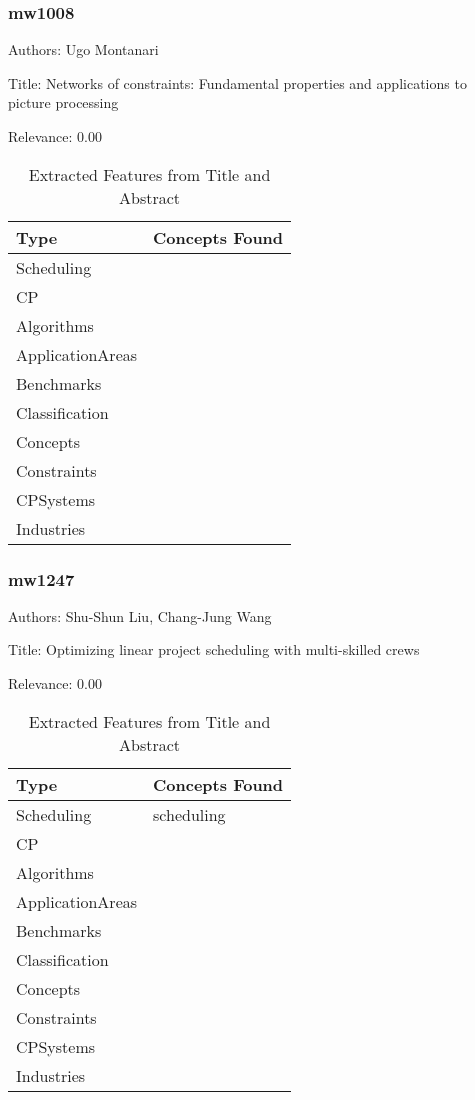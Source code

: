 \subsubsection{mw1008}
\label{mw:mw1008}

Authors: Ugo Montanari

Title: Networks of constraints: Fundamental properties and applications to picture processing

Relevance:  0.00

{\scriptsize
\begin{longtable}{p{2cm}p{20cm}}
\caption{Extracted Features from Title and Abstract}\\ \toprule
Type & Concepts Found\\ \midrule
\endhead
\bottomrule
\endfoot
Scheduling & \\ 
CP & \\ 
Algorithms & \\ 
ApplicationAreas & \\ 
Benchmarks & \\ 
Classification & \\ 
Concepts & \\ 
Constraints & \\ 
CPSystems & \\ 
Industries & \\ 
\end{longtable}
}



\subsubsection{mw1247}
\label{mw:mw1247}

Authors: Shu-Shun Liu, Chang-Jung Wang

Title: Optimizing linear project scheduling with multi-skilled crews

Relevance:  0.00

{\scriptsize
\begin{longtable}{p{2cm}p{20cm}}
\caption{Extracted Features from Title and Abstract}\\ \toprule
Type & Concepts Found\\ \midrule
\endhead
\bottomrule
\endfoot
Scheduling & scheduling\\ 
CP & \\ 
Algorithms & \\ 
ApplicationAreas & \\ 
Benchmarks & \\ 
Classification & \\ 
Concepts & \\ 
Constraints & \\ 
CPSystems & \\ 
Industries & \\ 
\end{longtable}
}



